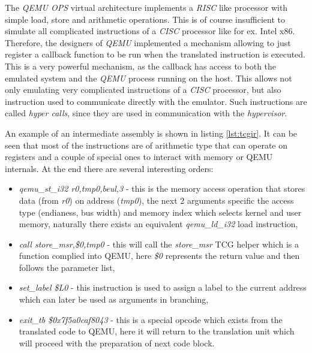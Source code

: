 The \textit{QEMU OPS} virtual architecture implements a \textit{RISC} like processor with simple load, store and arithmetic operations. This is of course insufficient to simulate all complicated instructions of a \textit{CISC} processor like for ex. Intel x86. Therefore, the designers of \textit{QEMU} implemented a mechanism allowing to just register a callback function to be run when the translated instruction is executed. This is a very powerful mechanism, as the callback has access to both the emulated system and the \textit{QEMU} process running on the host. This allows not only emulating very complicated instructions of a \textit{CISC} processor, but also instruction used to communicate directly with the emulator. Such instructions are called \textit{hyper calls}, since they are used in communication with the \textit{hypervisor}.

An example of an intermediate assembly is shown in listing \ref{lst:tcgir}. It can be seen that most of the instructions are of arithmetic type that can operate on registers and a couple of special ones to interact with memory or QEMU internals. At the end there are several interesting orders:
\begin{itemize}
    \item \textit{qemu\_st\_i32 r0,tmp0,beul,3} - this is the memory access operation that stores data (from \textit{r0}) on address (\textit{tmp0}), the next 2 arguments specific the access type (endianess, bus width) and memory index which selects kernel and user memory, naturally there exists an equivalent \textit{qemu\_ld\_i32} load instruction,
    \item \textit{call        store\_msr,\$0,tmp0} - this will call the \textit{store\_msr} TCG helper which is a function complied into QEMU, here \textit{\$0} represents the return value and then follows the parameter list,
    \item \textit{set\_label   \$L0} - this instruction is used to assign a label to the current address which can later be used as arguments in branching,
    \item \textit{exit\_tb     \$0x7f5a0caf8043} - this is a special opcode which exists from the translated code to QEMU, here it will return to the translation unit which will proceed with the preparation of next code block.
\end{itemize}

